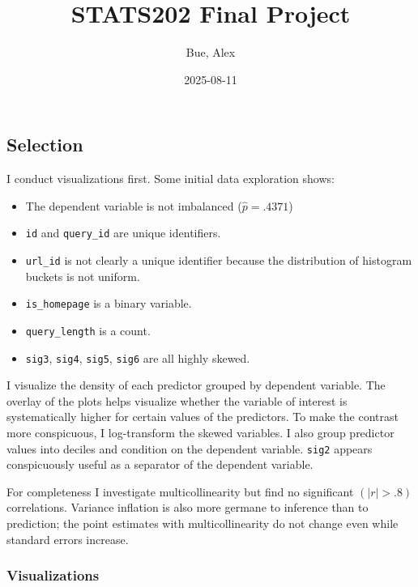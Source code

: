 \documentclass[
]{article}
\title{STATS202 Final Project}
\author{Bue, Alex}
\date{2025-08-11}
\providecommand{\tightlist}{%
  \setlength{\itemsep}{0pt}\setlength{\parskip}{0pt}}
\renewcommand*\contentsname{Table of contents}
\newcommand\contentsname{Table of contents}
\begin{document}
\maketitle

\renewcommand*\contentsname{Table of contents}
{
\hypersetup{linkcolor=}
\setcounter{tocdepth}{2}
\tableofcontents
}

\subsection{Selection}\label{selection}

I conduct visualizations first. Some initial data exploration shows:

\begin{itemize}
\tightlist
\item
  The dependent variable is not imbalanced (\(\hat{p} = .4371\))
\item
  \texttt{id} and \texttt{query\_id} are unique identifiers.
\item
  \texttt{url\_id} is not clearly a unique identifier because the
  distribution of histogram buckets is not uniform.
\item
  \texttt{is\_homepage} is a binary variable.
\item
  \texttt{query\_length} is a count.
\item
  \texttt{sig3}, \texttt{sig4}, \texttt{sig5}, \texttt{sig6} are all
  highly skewed.
\end{itemize}

I visualize the density of each predictor grouped by dependent variable.
The overlay of the plots helps visualize whether the variable of
interest is systematically higher for certain values of the predictors.
To make the contrast more conspicuous, I log-transform the skewed
variables. I also group predictor values into deciles and condition on
the dependent variable. \texttt{sig2} appears conspicuously useful as a
separator of the dependent variable.

For completeness I investigate multicollinearity but find no significant
\((|r| > .8)\) correlations. Variance inflation is also more germane to
inference than to prediction; the point estimates with multicollinearity
do not change even while standard errors increase.

\subsubsection{Visualizations}\label{visualizations}
\end{document}
